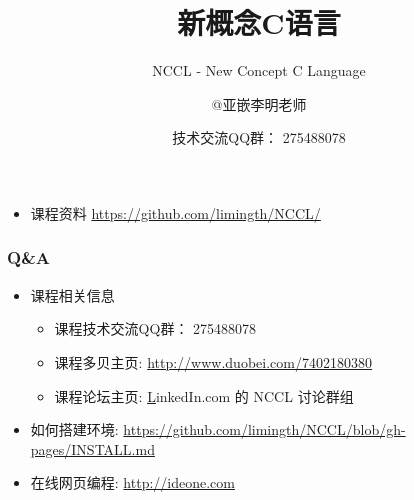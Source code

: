 \documentclass[10pt]{beamer}
\title{新概念C语言}
\subtitle{NCCL - New Concept C Language}
\author{@亚嵌李明老师}
\date{技术交流QQ群： 275488078}
\institute{www.akaedu.org}
\begin{document}
\begin{frame}
\titlepage
\begin{itemize}
\item 	课程资料 \url{https://github.com/limingth/NCCL/}
\end{itemize}
\end{frame}





\begin{frame}\frametitle{Q\&A}
\begin{itemize}
\item 	
	课程相关信息	
	\begin{itemize}
	\item 	
	课程技术交流QQ群： 275488078
	\item 	
	课程多贝主页: \url{http://www.duobei.com/7402180380}
	\item 	
	课程论坛主页: \href{http://www.linkedin.com/groups/Welcome-NCCL-group-4715078.S.185251633?qid=dce08638-0f74-4014-b9ad-ecab2ec33c5c&trk=group_most_popular-0-b-ttl&goback=.gsm_4715078_1_*2_*2_*2_lna_PENDING_*2.gmp_4715078.gde_4715078_member_185251633.gmp_4715078.gde_4715078_member_188465347.gmp_4715078} LinkedIn.com 的 NCCL 讨论群组
	\end{itemize}
\item 	
	如何搭建环境: 
	\url{https://github.com/limingth/NCCL/blob/gh-pages/INSTALL.md} 
\item 	
在线网页编程: \url{http://ideone.com}
\end{itemize}
\end{frame}
\end{document}
